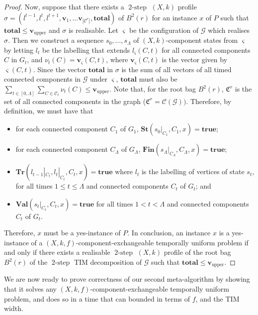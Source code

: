 \documentclass[a4paper,UKenglish,cleveref, autoref, thm-restate]{lipics-v2021} %
\DeclareMathOperator{\twostep}{2-step}
\begin{document}
\begin{toappendix}
\begin{proof}
    Now, suppose that there exists a $\twostep$ $(X,k)$ profile $\sigma=(l^{t-1},l^t,l^{t+1},\textbf{v}_1,\ldots\textbf{v}_{|\mathcal{C}^r|}, \textbf{total})$ of $B^2(r)$ for an instance $x$ of $P$ such that $\textbf{total}\leq \textbf{v}_{\text{upper}}$ and $\sigma$ is realisable. Let $\varsigma$ be the configuration of $\mathcal{G}$ which realises $\sigma$. Then we construct a sequence $s_0,\ldots, s_{\Lambda}$ of $(X,k)$-component states from $\varsigma$ by letting $l_{t}$ be the labelling that extends $l_{\varsigma}(C,t)$ for all connected components $C$ in $G_t$, and $\nu_t(C)=\textbf{v}_{\varsigma}(C,t)$, where $\textbf{v}_{\varsigma}(C,t)$ is the vector given by $\varsigma(C,t)$. Since the vector $\textbf{total}$ in $\sigma$ is the sum of all vectors of all timed connected components in $\mathcal{G}$ under $\varsigma$, $\textbf{total}$ must also be $\sum_{t\in[0,\Lambda]}\sum_{C\in\mathcal{C}_t}\nu_t(C)\leq \textbf{v}_{\text{upper}}$. Note that, for the root bag $B^2(r)$, $\mathfrak{C}^r$ is the set of all connected components in the graph ($\mathfrak{C}^r=\mathcal{C}(\mathcal{G}))$. Therefore, by definition, we must have that 
    \begin{itemize}
        \item for each connected component $C_1$ of $G_1$, $\textbf{St}(s_0|_{C_1},C_1,x)=\textbf{true}$;
        \item for each connected component $C_{\Lambda}$ of $G_{\Lambda}$, $\textbf{Fin}(s_{\Lambda}|_{C_{\Lambda}},C_{\Lambda},x)=\textbf{true}$;
        \item $\textbf{Tr}(l_{t-1}|_{C_t}, l_t|_{C_t}, C_t,x)=\textbf{true}$ where $l_t$ is the labelling of vertices of state $s_t$, for all times $1 \leq t \leq \Lambda$ and connected components $C_t$ of $G_t$; and
        \item $\textbf{Val}(s_t|_{C_t}, C_t,x)=\textbf{true}$ for all times $1 < t < \Lambda$ and connected components $C_t$ of $G_t$.
    \end{itemize}
    Therefore, $x$ must be a yes-instance of $P$. In conclusion, an instance $x$ is a yes-instance of a $(X,k,f)$-component-exchangeable temporally uniform problem if and only if there exists a realisable $\twostep$ $(X,k)$ profile of the root bag $B^2(r)$ of the $\twostep$ TIM decomposition of $\mathcal{G}$ such that $\textbf{total}\leq \textbf{v}_{\text{upper}}$.
\end{proof}

We are now ready to prove correctness of our second meta-algorithm by showing that it solves any $(X,k,f)$-component-exchangeable temporally uniform problem, and does so in a time that can bounded in terms of $f$, and the TIM width.

\end{toappendix}
\end{document}
